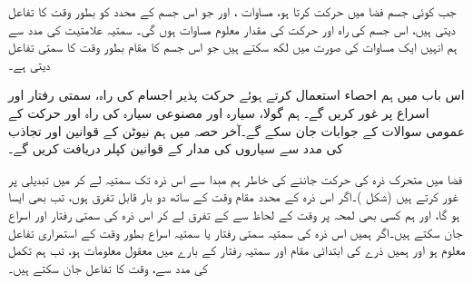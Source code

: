 
\quad
جب کوئی جسم فضا میں حرکت کرتا ہو،   مساوات   ،  اور   جو اس جسم کے محدد  کو بطور وقت کا تفاعل  دیتی ہیں،  اس جسم کی راہ اور حرکت کی مقدار معلوم مساوات ہوں گی۔ سمتیہ   علامتیت  کی مدد سے ہم انہیں ایک مساوات  کی صورت میں لکھ سکتے ہیں جو اس جسم کا مقام بطور وقت کا سمتی تفاعل دیتی ہے۔

اس باب میں  ہم احصاء استعمال کرتے ہوئے حرکت پذیر اجسام کی راہ، سمتی رفتار اور اسراع پر غور کریں گے۔ ہم  گولا،  سیارہ  اور مصنوعی سیارہ کی راہ اور حرکت کے عمومی سوالات کے جوابات جان سکے گے۔آخر حصہ میں ہم نیوٹن کے قوانین اور    تجاذب کی مدد سے سیاروں کی مدار کے  قوانین کپلر دریافت کریں گے۔ 


فضا میں متحرک ذرہ    کی حرکت جاننے کی خاطر ہم  مبدا سے  اس ذرہ  تک سمتیہ  لے کر  میں تبدیلی پر غور کرتے ہیں (شکل )۔اگر اس ذرہ  کے محدد مقام  وقت کے ساتھ دو بار قابل تفرق ہوں،  تب   بھی ایسا ہو گا، اور ہم کسی بھی لمحہ پر وقت کے لحاظ سے     کے  تفرق لے کر اس ذرہ  کی سمتی رفتار اور اسراع جان سکتے ہیں۔اگر ہمیں اس ذرہ  کی سمتیہ  سمتی رفتار یا سمتیہ  اسراع   بطور  وقت کے استمراری تفاعل معلوم ہو اور ہمیں ذرے کی ابتدائی  مقام اور سمتیہ رفتار کے بارے میں معقول معلومات ہو، تب ہم تکمل کی مدد سے، وقت کا تفاعل   جان سکتے ہیں۔

